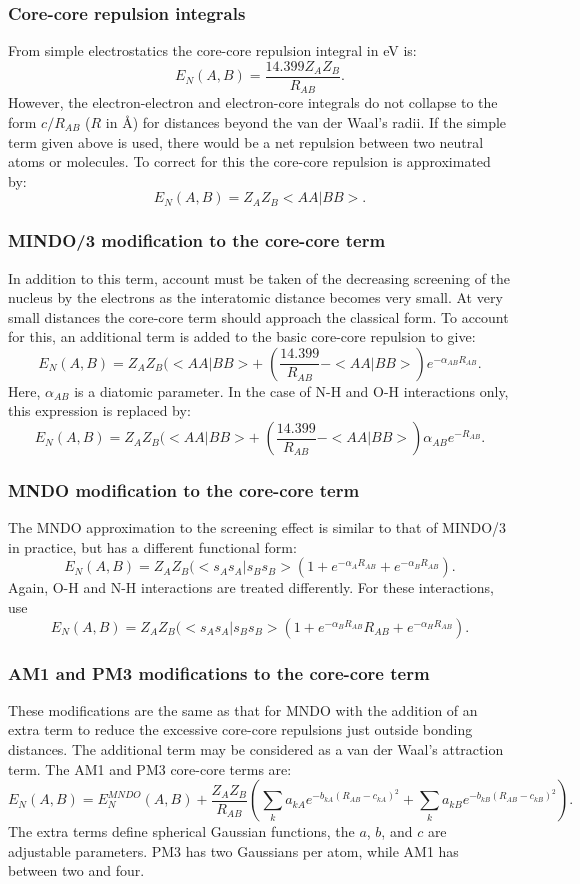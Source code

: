 \subsubsection{Core-core repulsion integrals}
 From simple electrostatics the core-core repulsion
integral in eV is:
$$
E_N(A,B)=\frac{14.399Z_AZ_B}{R_{AB}}.
$$
However, the electron-electron and electron-core integrals
do not collapse to the form $c/R_{AB}$ ($R$ in \AA ) for distances
beyond the van der Waal's radii. If the simple term given
above is used, there would be a net repulsion between two
neutral atoms or molecules. To correct for this the
core-core repulsion is approximated by:
$$
E_N(A,B)=Z_AZ_B<AA|BB>.
$$
\subsubsection{MINDO/3 modification to the core-core term}
 In addition to this term, account must be taken of the
decreasing screening of the nucleus by the electrons as the
interatomic distance becomes very small. At very small
distances the core-core term should approach the classical
form. To account for this, an additional term is added to
the basic core-core repulsion to give:
$$
E_N(A,B)=Z_AZ_B(<AA|BB>+\;(\frac{14.399}{R_{AB}}-<AA|BB>)e^{-\alpha_{AB}R_{AB}}.
$$
 Here, $\alpha_{AB}$ is a diatomic parameter. In the case of N-H
and O-H interactions only, this expression is replaced by:
$$
E_N(A,B)=Z_AZ_B(<AA|BB>+\;(\frac{14.399}{R_{AB}}-<AA|BB>)\alpha_{AB}e^{-R_{AB} }.
$$
\subsubsection{MNDO modification to the core-core term}
 The MNDO approximation to the screening effect is
similar to that of MINDO/3 in practice, but has a different
functional form:
$$
E_N(A,B)=Z_AZ_B(<s_As_A|s_Bs_B>(1+e^{-\alpha_AR_{AB}} +e^{-\alpha_BR_{AB}}).
$$
 Again, O-H and N-H interactions are treated differently.
For these interactions, use
$$
E_N(A,B)=Z_AZ_B(<s_As_A|s_Bs_B>(1+e^{-\alpha_BR_{AB}}R_{AB}  +e^{-\alpha_HR_{AB}}).
$$
\subsubsection{AM1 and PM3 modifications to the core-core term}
 These modifications are the same as that for MNDO with
the addition of an extra term to reduce the excessive
core-core repulsions just outside bonding distances. The
additional term may be considered as a van der Waal's
attraction term. The AM1 and PM3 core-core terms are:
$$
E_N(A,B)=E_N^{MNDO}(A,B)+\frac{Z_AZ_B}{R_{AB}}
(\sum_ka_{kA}e^{-b_{kA}(R_{AB}-c_{kA})^2}+\sum_ka_{kB}e^{-b_{kB}(R_{AB}-c_{kB})^2}).
$$
The extra terms define spherical Gaussian functions, the $a$,
$b$, and $c$ are adjustable parameters. PM3 has two Gaussians
per atom, while AM1 has between two and four.

